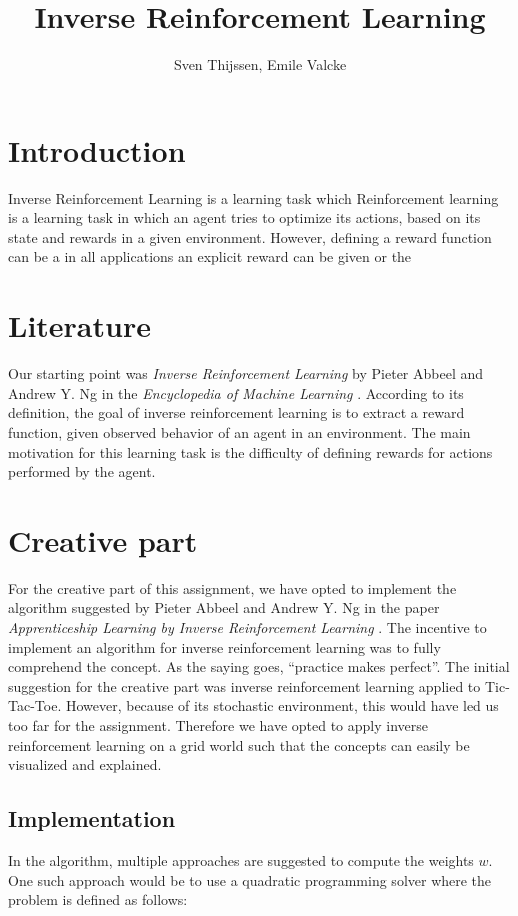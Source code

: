 \documentclass[10pt,a4paper,twocolumn]{article}
\author{Sven Thijssen, Emile Valcke}
\title{Inverse Reinforcement Learning}
\begin{document}
\maketitle

\section{Introduction}
Inverse Reinforcement Learning is a learning task which 
Reinforcement learning is a learning task in which an agent tries to optimize its actions, based on its state and rewards in a given environment. However, defining a reward function can be a  in all applications an explicit reward can be given or the 

\section{Literature}
Our starting point was \textit{Inverse Reinforcement Learning} by Pieter Abbeel and Andrew Y. Ng in the \textit{Encyclopedia of Machine Learning} \cite{sammut2011encyclopedia}. According to its definition, the goal of inverse reinforcement learning is to extract a reward function, given observed behavior of an agent in an environment. The main motivation for this learning task is the difficulty of defining rewards for actions performed by the agent. 

\section{Creative part}
For the creative part of this assignment, we have opted to implement the algorithm suggested by Pieter Abbeel and Andrew Y. Ng  in the paper \textit{Apprenticeship Learning by Inverse Reinforcement Learning} \cite{abbeel2004apprenticeship}. The incentive to implement an algorithm for inverse reinforcement learning was to fully comprehend the concept. As the saying goes, ``practice makes perfect''. The initial suggestion for the creative part was inverse reinforcement learning applied to Tic-Tac-Toe. However, because of its stochastic environment, this would have led us too far for the assignment. Therefore we have opted to apply inverse reinforcement learning on a grid world such that the concepts can easily be visualized and explained.

\subsection{Implementation}
In the algorithm, multiple approaches are suggested to compute the weights $w$. One such approach would be to use a quadratic programming solver where the problem is defined as follows:
\end{document}
